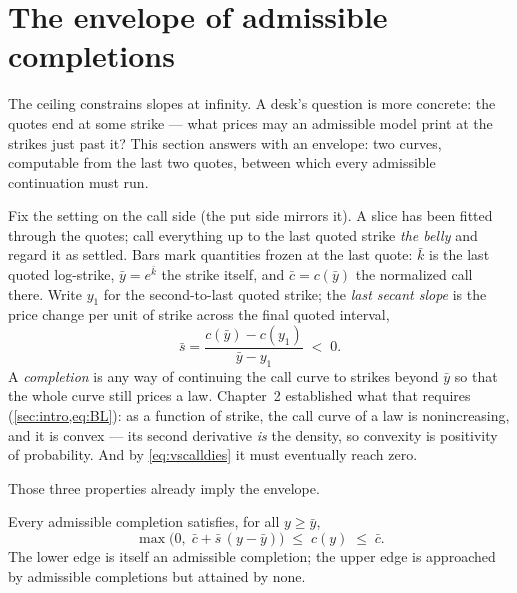 \section{The envelope of admissible completions}
\label{sec:vsenvelope}

The ceiling constrains slopes at infinity.  A desk's question is more
concrete: the quotes end at some strike --- what prices may an
admissible model print at the strikes just past it?  This section answers
with an envelope: two curves, computable from the last two quotes,
between which every admissible continuation must run.

Fix the setting on the call side (the put side mirrors it).  A slice
has been fitted through the quotes; call everything up to the last
quoted strike \emph{the belly} and regard it as settled.  Bars mark
quantities frozen at the last quote: $\bar k$ is the last quoted
log-strike, $\bar y=e^{\bar k}$ the strike itself, and
$\bar c=c(\bar y)$ the normalized call there.  Write $y_1$ for the
second-to-last quoted strike; the \emph{last secant slope} is the
price change per unit of strike across the final quoted interval,
\[
\bar s=\frac{c(\bar y)-c(y_1)}{\bar y-y_1}\;<\;0 .
\]  A
\emph{completion} is any way of continuing the call curve to
strikes beyond $\bar y$ so that the whole curve still prices a law.
Chapter~2 established what that requires
(\cref{sec:intro,eq:BL}): as a function of strike, the call curve of
a law is nonincreasing, and it is convex --- its second derivative
\emph{is} the density, so convexity is positivity of probability.
And by \eqref{eq:vscalldies} it must eventually reach zero.

Those three properties already imply the envelope.

\begin{proposition}
\label{prop:vscone}
Every admissible completion satisfies, for all $y\ge\bar y$,
\begin{equation}
\max\!\big(0,\;\bar c+\bar s\,(y-\bar y)\big)
\;\le\;c(y)\;\le\;\bar c .
\label{eq:vscone}
\end{equation}
The lower edge is itself an admissible completion; the upper edge is
approached by admissible completions but attained by none.
\end{proposition}

